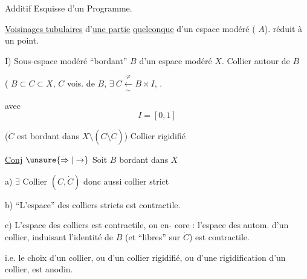 Additif Esquisse d'un Programme.

\uline{Voisinages tubulaires} d'\uline{une partie}
 \uline{quelconque} d'un
espace modéré ( $A$).  réduit à
un point.


I) Sous-espace modéré ``bordant''  $B$ d'un espace
modéré $X$. Collier autour de $B$

( $B\subset C\subset X$,
$C$ vois. de $B$, $\exists\ C\xleftarrow[\sim]{\varphi}B\times I$,
.

avec 
\[
I=[0,1]
\]



($\dot C$ est bordant dans $X\setminus(C\setminus\dot C)$)
Collier rigidifié

\uline{Conj} $\unsure{\Rightarrow|\to}$ Soit $B$ bordant dans $X$

a) $\exists$ Collier $(C,\dot C)$ donc aussi collier strict

b) ``L'espace'' des colliers stricts est contractile.

c) L'espace des 
colliers  est contractile, ou en-
core : l'espace des autom. d'un
collier, induisant l'identité de $B$
(et ``libres'' sur $\dot C$) est contractile.

i.e. le choix d'un collier, ou d'un collier  rigidifié,
ou d'une rigidification d'un collier, est
anodin.
